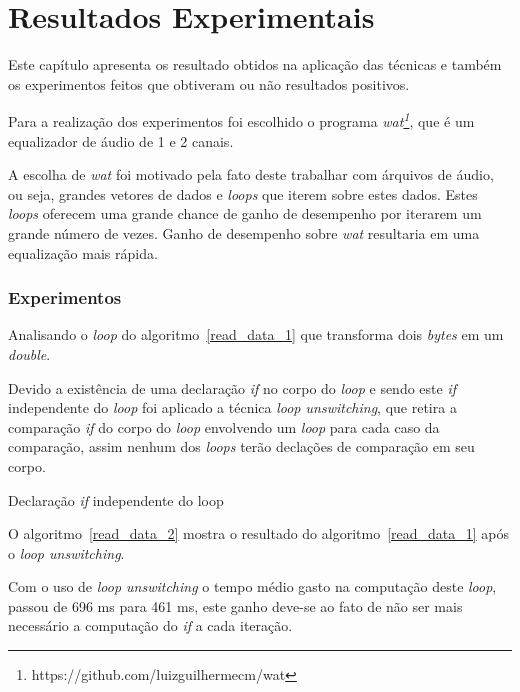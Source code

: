 
\chapter{Resultados Experimentais}

Este capítulo apresenta os resultado obtidos na aplicação das técnicas e também
os experimentos feitos que obtiveram ou não resultados positivos.

Para a realização dos experimentos foi escolhido o programa
\textit{wat\footnote{https://github.com/luizguilhermecm/wat}}, que é um
equalizador de áudio de 1 e 2 canais.

A escolha de \textit{wat} foi motivado pela fato deste trabalhar com árquivos de
áudio, ou seja, grandes vetores de dados e \textit{loops} que iterem sobre estes
dados. 
Estes \textit{loops} oferecem uma grande chance de ganho de desempenho por
iterarem um grande número de vezes.
Ganho de desempenho sobre \textit{wat} resultaria em uma equalização mais rápida.

\subsection{Experimentos}
Analisando o \textit{loop} do algoritmo~\ref{read_data_1} que 
transforma dois \textit{bytes} em um \textit{double}.

Devido a existência de uma declaração \textit{if} no corpo do \textit{loop} e
sendo este \textit{if} independente do \textit{loop} foi
aplicado a técnica \textit{loop unswitching}, que retira a comparação
\textit{if} do corpo do \textit{loop} envolvendo um \textit{loop} para cada caso
da comparação, assim nenhum dos \textit{loops} terão declações de comparação em seu
corpo.

\begin{algorithm}
    \caption{Declaração \textit{if} independente do loop}
    \label{read_data_1}

\end{algorithm}

O algoritmo~\ref{read_data_2} mostra o resultado do algoritmo~\ref{read_data_1} 
após o \textit{loop unswitching}.

Com o uso de \textit{loop unswitching} o tempo médio gasto na computação deste
\textit{loop}, passou de 696 ms para 461 ms, este ganho deve-se ao fato de não
ser mais necessário a computação do \textit{if} a cada iteração. 


